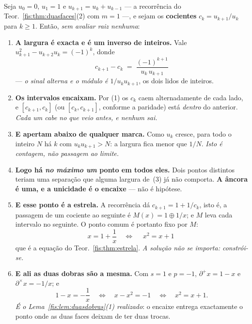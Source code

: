\documentclass[livro.tex]{subfiles}
\begin{document}
\begin{teorema}\label{fis:thm:estrelaencaixe}
Seja $u_0=0$, $u_1=1$ e $u_{k+1}=u_k+u_{k-1}$ --- a recorrência do
Teor.~\ref{fis:thm:duasfaces}(2) com $m=1$ ---, e sejam os \textbf{cocientes}
$c_k=u_{k+1}/u_k$ para $k\ge1$. Então, \emph{sem avaliar raiz nenhuma}:
\begin{enumerate}\itemsep3pt
\item[(1)] \textbf{A largura é exacta e é um inverso de inteiros.} Vale
$u_{k+1}^{2}-u_{k+2}u_{k}=(-1)^{k}$, donde
\[
\boxed{\;c_{k+1}-c_{k}\;=\;\frac{(-1)^{k+1}}{u_{k}\,u_{k+1}}\;}
\]
--- \emph{o sinal alterna e o módulo é $1/u_ku_{k+1}$}, os dois lidos de
inteiros.
\item[(2)] \textbf{Os intervalos encaixam.} Por (1) os $c_k$ caem alternadamente
de cada lado, e $[c_{k+1},c_k]$ (ou $[c_k,c_{k+1}]$, conforme a paridade) está
\emph{dentro} do anterior. \emph{Cada um cabe no que veio antes, e nenhum sai.}
\item[(3)] \textbf{E apertam abaixo de qualquer marca.} Como $u_k$ cresce, para
todo o inteiro $N$ há $k$ com $u_ku_{k+1}>N$: a largura fica menor que $1/N$.
\emph{Isto é contagem, não passagem ao limite.}
\item[(4)] \textbf{Logo há \emph{no máximo um} ponto em todos eles.} Dois pontos
distintos teriam uma separação que alguma largura de~(3) já não comporta.
\textbf{A âncora é uma, e a unicidade é o encaixe} --- não é hipótese.
\item[(5)] \textbf{E esse ponto é a estrela.} A recorrência dá
$c_{k+1}=1+1/c_k$, isto é, a passagem de um cociente ao seguinte é
$M(x)=1\oplus 1/x$; e $M$ leva cada intervalo no seguinte. O ponto comum é
portanto fixo por $M$:
\[
x=1+\frac1x\quad\Longleftrightarrow\quad\boxed{\;x^{2}=x+1\;}
\]
que é a equação do Teor.~\ref{fis:thm:estrela}. \emph{A solução não se importa:
constrói-se.}
\item[(6)] \textbf{E ali as duas dobras são a mesma.} Com $s=1$ e $p=-1$,
$\partial^{+}x=1-x$ e $\partial^{\times}x=-1/x$; e
\[
1-x=-\frac1x\quad\Longleftrightarrow\quad x-x^{2}=-1\quad\Longleftrightarrow\quad x^{2}=x+1 .
\]
\emph{É o Lema~\ref{fis:lem:duasdobras}(1) realizado}: o encaixe entrega
exactamente o ponto onde as duas faces deixam de ter duas trocas.
\end{enumerate}
\end{teorema}
\end{document}
